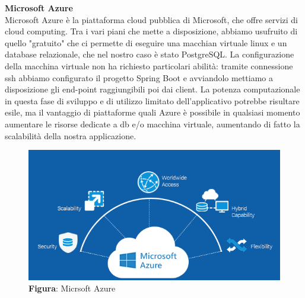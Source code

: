     \begin{flushleft}
        \textbf{Microsoft Azure}\\
        Microsoft Azure è la piattaforma cloud pubblica di Microsoft, che offre servizi di cloud computing. Tra i vari piani che mette a disposizione, abbiamo usufruito
        di quello "gratuito" che ci permette di eseguire una macchian virtuale linux e un database relazionale, che nel nostro caso è stato PostgreSQL.
        La configurazione della macchina virtuale non ha richiesto particolari abilità: tramite connessione ssh abbiamo configurato il progetto Spring Boot e avviandolo 
        mettiamo a disposizione gli end-point raggiungibili poi dai client.
        La potenza computazionale in questa fase di sviluppo e di utilizzo limitato dell'applicativo potrebbe risultare esile, ma il vantaggio di piattaforme quali
        Azure è possibile in qualsiasi momento aumentare le risorse dedicate a db e/o macchina virtuale, aumentando di fatto la scalabilità della nostra applicazione.

    \end{flushleft}

    \begin{figure}[H]
        \centering
        \includegraphics[scale=0.5]{assets/immagini varie/azure loc.png}
        \caption*{\textbf{Figura}: Micrsoft Azure}\label{fig:mic_az}
    \end{figure}